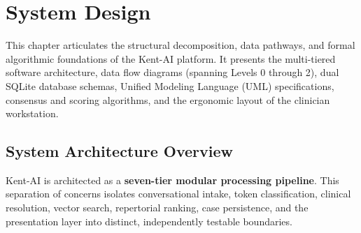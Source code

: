 
\chapter{System Design}
\label{Chapter4}

This chapter articulates the structural decomposition, data pathways, and formal algorithmic foundations of the Kent-AI platform. It presents the multi-tiered software architecture, data flow diagrams (spanning Levels 0 through 2), dual SQLite database schemas, Unified Modeling Language (UML) specifications, consensus and scoring algorithms, and the ergonomic layout of the clinician workstation.


\section{System Architecture Overview}

Kent-AI is architected as a \textbf{seven-tier modular processing pipeline}. This separation of concerns isolates conversational intake, token classification, clinical resolution, vector search, repertorial ranking, case persistence, and the presentation layer into distinct, independently testable boundaries.

